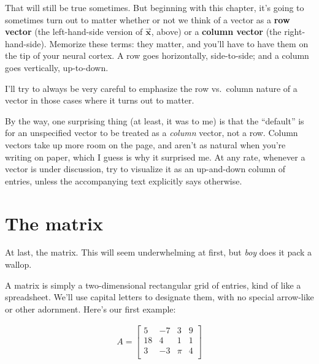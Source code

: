
That will still be true sometimes. But beginning with this chapter, it's going
to sometimes turn out to matter whether or not we think of a vector as a
\textbf{row vector} (the left-hand-side version of
$\overrightarrow{\textbf{x}}$, above) or a \textbf{column vector} (the
right-hand-side). Memorize these terms: they matter, and you'll have to have
them on the tip of your neural cortex. A row goes horizontally, side-to-side;
and a column goes vertically, up-to-down.

I'll try to always be very careful to emphasize the row vs.~column nature of a
vector in those cases where it turns out to matter.


By the way, one surprising thing (at least, it was to me) is that the
``default'' is for an unspecified vector to be treated as a \textit{column}
vector, not a row. Column vectors take up more room on the page, and aren't as
natural when you're writing on paper, which I guess is why it surprised me. At
any rate, whenever a vector is under discussion, try to visualize it as an
up-and-down column of entries, unless the accompanying text explicitly says
otherwise.

\section{The matrix}


At last, the matrix. This will seem underwhelming at first, but \textit{boy}
does it pack a wallop.

A matrix is simply a two-dimensional rectangular grid of entries, kind of like
a spreadsheet. We'll use capital letters to designate them, with no special
arrow-like or other adornment. Here's our first example:

\vspace{-.15in}
\begin{align*}
A =
\begin{bmatrix}
5 &-7 &3 &9 \\
18 &4 &1 &1 \\
3 &-3 &\pi &4 \\
\end{bmatrix}
\end{align*}
\vspace{-.15in}


